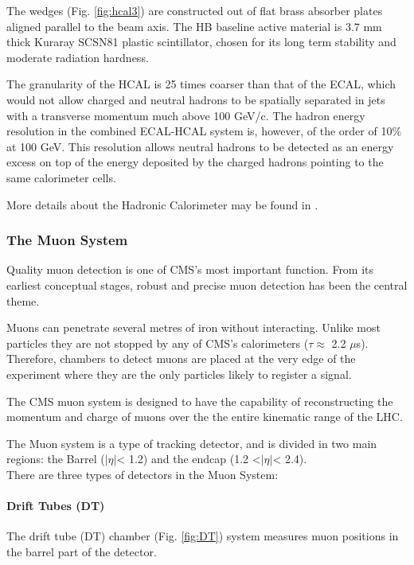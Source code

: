 The wedges (Fig. \ref{fig:hcal3}) are constructed out of flat brass absorber plates aligned parallel to the beam axis.
The HB baseline active material is 3.7 mm thick Kuraray SCSN81 plastic scintillator, chosen for its long term stability and moderate radiation hardness.

The granularity of the HCAL is 25 times coarser than that of
the ECAL, which would not allow charged and neutral hadrons to be spatially separated in jets with a transverse momentum much above 100 GeV/c. The hadron energy resolution in the combined ECAL-HCAL system is, however, of the order of 10$\%$ at 100 GeV. This resolution allows neutral hadrons to be detected as an energy excess on top of the energy deposited by the charged hadrons pointing to the same calorimeter cells.

More details about the Hadronic Calorimeter may be found in \cite{HCAL2, HCAL3, HCAL4, HCAL5}.

\subsubsection{The Muon System}
\noindent Quality muon detection is one of CMS's most important function. From its earliest conceptual stages, robust and precise muon detection has been the central theme.

Muons can penetrate several metres of iron without interacting. Unlike most particles they are not stopped by any of CMS's calorimeters ($\tau \approx$ 2.2 $\mu$s). Therefore, chambers to detect muons are placed at the very edge of the experiment where they are the only particles likely to register a signal. 

\noindent
The CMS muon system is designed to have the capability of reconstructing the momentum and charge of muons over the the entire kinematic range of the LHC. 

\noindent
The Muon system is a type of tracking detector, and is divided in two main regions: the Barrel ($|\eta|$< 1.2) and  the endcap (1.2 <$|\eta|$< 2.4).\\
There are three types of detectors in the Muon System:

\paragraph{Drift Tubes (DT)}
The drift tube (DT) chamber (Fig. \ref{fig:DT}) system measures muon positions in the barrel part of the detector.


